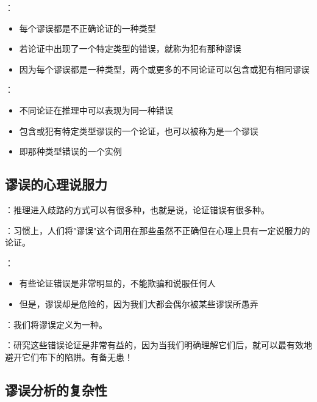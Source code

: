 \begin{theorembox}[title=谬误的类型特征]
：
\begin{itemize}
  \item 每个谬误都是不正确论证的一种类型
  \item 若论证中出现了一个特定类型的错误，就称为犯有那种谬误
  \item 因为每个谬误都是一种类型，两个或更多的不同论证可以包含或犯有相同谬误
\end{itemize}

：
\begin{itemize}
  \item 不同论证在推理中可以表现为同一种错误
  \item 包含或犯有特定类型谬误的一个论证，也可以被称为是一个谬误
  \item 即那种类型错误的一个实例
\end{itemize}
\end{theorembox}

\subsection{谬误的心理说服力}

\begin{theorembox}[title=谬误的欺骗性特征]
：推理进入歧路的方式可以有很多种，也就是说，论证错误有很多种。

：习惯上，人们将"谬误"这个词用在那些虽然不正确但在心理上具有一定说服力的论证。

：
\begin{itemize}
  \item 有些论证错误是非常明显的，不能欺骗和说服任何人
  \item 但是，谬误却是危险的，因为我们大都会偶尔被某些谬误所愚弄
\end{itemize}

：我们将谬误定义为一种。

：研究这些错误论证是非常有益的，因为当我们明确理解它们后，就可以最有效地避开它们布下的陷阱。有备无患！
\end{theorembox}

\subsection{谬误分析的复杂性}


